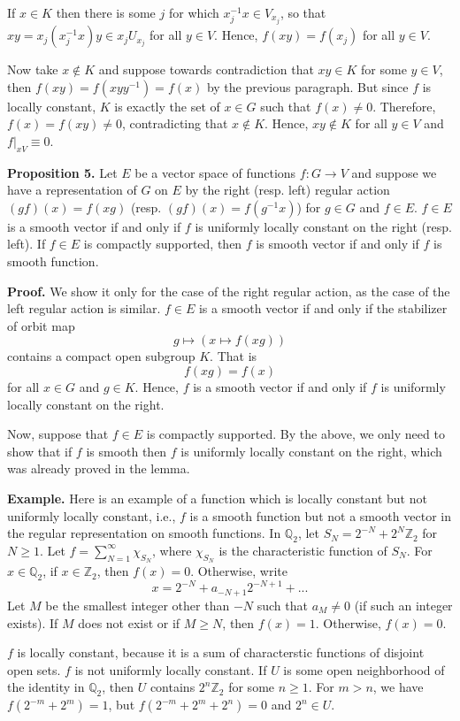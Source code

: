 \documentclass[12pt]{article}
\begin{document}
If $x \in K$ then there is some $j$ for which $x_{j}^{-1} x \in V_{x_{j}}$, so
that $xy = x_{j}\left(x_{j}^{-1}x\right)y \in x_{j}U_{x_{j}}$ for all $y \in V$.
Hence, $f\left(xy\right) = f\left(x_{j}\right)$ for all $y \in V$.

Now take $x \not\in K$ and suppose towards contradiction that $xy \in K$ for
some $y \in V$, then $f\left(xy\right) = f\left(xyy^{-1}\right) =
f\left(x\right)$ by the previous paragraph. But since $f$ is locally constant,
$K$ is exactly the set of $x \in G$ such that $f\left(x\right) \neq 0$.
Therefore, $f\left(x\right) = f\left(xy\right) \neq 0$, contradicting that $x
\not\in K$. Hence, $xy \not\in K$ for all $y \in V$ and $f|_{xV} \equiv 0$.

\textbf{Proposition 5.} Let $E$ be a vector space of functions $f : G
\rightarrow V$ and suppose we have a representation of $G$ on $E$ by the right
(resp. left) regular action $\left(gf\right)\left(x\right) = f\left(xg\right)$
(resp. $\left(gf\right)\left(x\right) = f\left(g^{-1}x\right)$) for $g \in G$
and $f \in E$. $f \in E$ is a smooth vector if and only if $f$ is uniformly
locally constant on the right (resp. left). If $f \in E$ is compactly supported,
then $f$ is smooth vector if and only if $f$ is smooth function. 

\textbf{Proof.} We show it only for the case of the right regular action, as the
case of the left regular action is similar. $f \in E$ is a smooth vector if and
only if the stabilizer of orbit map 
%
\[g \mapsto \left(x \mapsto f\left(xg\right)\right)\]
%
contains a compact open subgroup $K$. That is 
%
\[f\left(xg\right) = f\left(x\right)\]
%
for all $x \in G$ and $g \in K$. Hence, $f$ is a smooth vector if and only if
$f$ is uniformly locally constant on the right.

Now, suppose that $f \in E$ is compactly supported. By the above, we only need
to show that if $f$ is smooth then $f$ is uniformly locally constant on the
right, which was already proved in the lemma. 

\textbf{Example.} Here is an example of a function which is locally constant but
not uniformly locally constant, i.e., $f$ is a smooth function but not a smooth
vector in the regular representation on smooth functions. In $\mathbb{Q}_{2}$,
let $S_{N} = 2^{-N} + 2^{N}\mathbb{Z}_{2}$ for $N \geq 1$. Let $f = \sum_{N =
1}^{\infty} \chi_{S_{N}}$, where $\chi_{S_{N}}$ is the characteristic function
of $S_{N}$. For $x \in \mathbb{Q}_{2}$, if $x \in \mathbb{Z}_{2}$, then
$f\left(x\right) = 0$. Otherwise, write
%
\[x = 2^{-N} + a_{-N + 1} 2^{-N + 1} + ...\]
%
Let $M$ be the smallest integer other than $-N$ such that $a_{M} \neq 0$ (if
such an integer exists). If $M$ does not exist or if $M \geq N$, then
$f\left(x\right) = 1$. Otherwise, $f\left(x\right) = 0$. 

$f$ is locally constant, because it is a sum of characterstic functions of
disjoint open sets. $f$ is not uniformly locally constant. If $U$ is some open
neighborhood of the identity in $\mathbb{Q}_{2}$, then $U$ contains
$2^{n}\mathbb{Z}_{2}$ for some $n \geq 1$. For $m > n$, we have $f\left(2^{-m} +
2^{m}\right) = 1$, but $f\left(2^{-m} + 2^{m} + 2^{n}\right) = 0$ and $2^{n} \in
U$.
\end{document}
